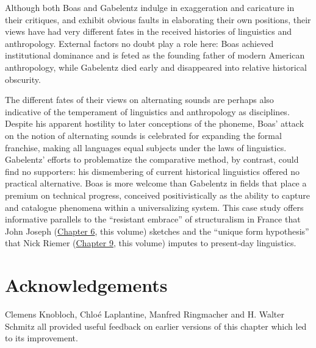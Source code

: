 \documentclass[output=paper]{langscibook}
\begin{document}
Although both Boas and Gabelentz indulge in exaggeration and caricature in their critiques, and exhibit obvious faults in elaborating their own positions, their views have had very different fates in the received histories of linguistics and anthropology. External factors no doubt play a role here: Boas achieved institutional dominance and is feted as the founding father of modern American anthropology, while Gabelentz died early and disappeared into relative historical obscurity. 

The different fates of their views on alternating sounds are perhaps also indicative of the temperament of linguistics and anthropology as disciplines. Despite his apparent hostility to later conceptions of the phoneme, Boas' attack on the notion of alternating sounds is celebrated for expanding the formal franchise, making all languages equal subjects under the laws of linguistics. Gabelentz' efforts to problematize the comparative method, by contrast, could find no supporters: his dismembering of current historical linguistics offered no practical alternative. Boas is more welcome than Gabelentz in fields that place a premium on technical progress, conceived positivistically as the ability to capture and catalogue phenomena within a universalizing system. This case study offers informative parallels to the ``resistant embrace'' of structuralism in France that John Joseph (\hyperref[chap:joseph]{Chapter 6}, this volume) sketches and the ``unique form hypothesis'' that Nick Riemer (\hyperref[chap:riemer]{Chapter 9}, this volume) imputes to present-day linguistics.

\section*{Acknowledgements}

Clemens Knobloch, Chloé Laplantine, Manfred Ringmacher and H. Walter Schmitz all provided useful feedback on earlier versions of this chapter which led to its improvement.

\sloppy
\printbibliography[heading=subbibliography,notkeyword=this]
\end{document}
